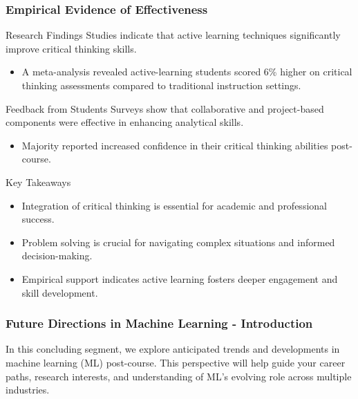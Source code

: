 \documentclass[aspectratio=169]{beamer}
\begin{document}
\begin{frame}[fragile]
    \frametitle{Empirical Evidence of Effectiveness}

    \begin{block}{Research Findings}
        Studies indicate that active learning techniques significantly improve critical thinking skills. 
        \begin{itemize}
            \item A meta-analysis revealed active-learning students scored 6\% higher on critical thinking assessments compared to traditional instruction settings.
        \end{itemize}
    \end{block}

    \begin{block}{Feedback from Students}
        Surveys show that collaborative and project-based components were effective in enhancing analytical skills.
        \begin{itemize}
            \item Majority reported increased confidence in their critical thinking abilities post-course.
        \end{itemize}
    \end{block}

    \begin{block}{Key Takeaways}
        \begin{itemize}
            \item Integration of critical thinking is essential for academic and professional success.
            \item Problem solving is crucial for navigating complex situations and informed decision-making.
            \item Empirical support indicates active learning fosters deeper engagement and skill development.
        \end{itemize}
    \end{block}
\end{frame}

\begin{frame}[fragile]
    \frametitle{Future Directions in Machine Learning - Introduction}
    In this concluding segment, we explore anticipated trends and developments in machine learning (ML) post-course. 
    This perspective will help guide your career paths, research interests, and understanding of ML's evolving role across multiple industries.
\end{frame}
\end{document}
